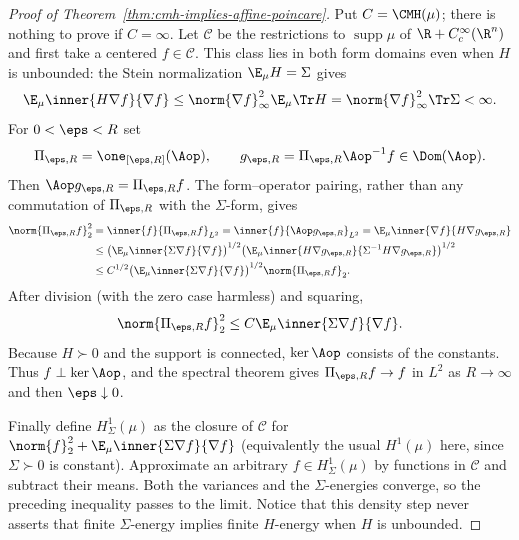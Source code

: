 \documentclass[../../main.tex]{subfiles}
\begin{document}
\begin{proof}[Proof of Theorem~\ref{thm:cmh-implies-affine-poincare}]
Put $C=\CMH(\mu)$; there is nothing to prove if $C=\infty$.  Let
$\mathscr C$ be the restrictions to $\operatorname{supp}\mu$ of
$\R+C_c^\infty(\R^n)$ and first take a centered $f\in\mathscr C$.  This class lies in both
form domains even when $H$ is unbounded: the Stein normalization $\E_\mu H=\Sigma$ gives
\[
  \E_\mu\inner{H\nabla f}{\nabla f}
  \le \norm{\nabla f}_\infty^2\E_\mu\Tr H
  =\norm{\nabla f}_\infty^2\Tr\Sigma<\infty.
\]
For
$0<\eps<R$ set
\[
  \Pi_{\eps,R}=\one_{[\eps,R]}(\Aop),
  \qquad g_{\eps,R}=\Pi_{\eps,R}\Aop^{-1}f\in\Dom(\Aop).
\]
Then $\Aop g_{\eps,R}=\Pi_{\eps,R}f$.  The form--operator pairing, rather than any commutation
of $\Pi_{\eps,R}$ with the $\Sigma$-form, gives
\begin{align*}
  \norm{\Pi_{\eps,R}f}_2^2
  &=\inner{f}{\Pi_{\eps,R}f}_{L^2}
    =\inner{f}{\Aop g_{\eps,R}}_{L^2}
    =\E_\mu\inner{\nabla f}{H\nabla g_{\eps,R}}\\
  &\le
    \bigl(\E_\mu\inner{\Sigma\nabla f}{\nabla f}\bigr)^{1/2}
    \bigl(\E_\mu\inner{H\nabla g_{\eps,R}}
                            {\Sigma^{-1}H\nabla g_{\eps,R}}\bigr)^{1/2}\\
  &\le C^{1/2}
    \bigl(\E_\mu\inner{\Sigma\nabla f}{\nabla f}\bigr)^{1/2}
    \norm{\Pi_{\eps,R}f}_2.
\end{align*}
After division (with the zero case harmless) and squaring,
\[
  \norm{\Pi_{\eps,R}f}_2^2
  \le C\E_\mu\inner{\Sigma\nabla f}{\nabla f}.
\]
Because $H\succ0$ and the support is connected, $\ker\Aop$ consists of the constants.  Thus
$f\perp\ker\Aop$, and the spectral theorem gives
$\Pi_{\eps,R}f\to f$ in $L^2$ as $R\to\infty$ and then $\eps\downarrow0$.

Finally define $H^1_\Sigma(\mu)$ as the closure of $\mathscr C$ for
$\norm{f}_2^2+\E_\mu\inner{\Sigma\nabla f}{\nabla f}$ (equivalently the usual $H^1(\mu)$ here,
since $\Sigma\succ0$ is constant).  Approximate an arbitrary $f\in H^1_\Sigma(\mu)$ by
functions in $\mathscr C$ and subtract their means.  Both the variances and the
$\Sigma$-energies converge, so
the preceding inequality passes to the limit.  Notice that this density step never asserts
that finite $\Sigma$-energy implies finite $H$-energy when $H$ is unbounded.
\end{proof}
\end{document}
